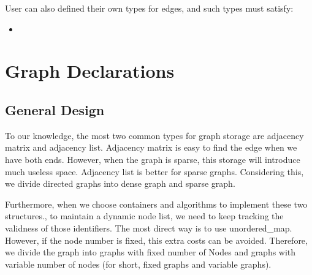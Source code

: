 \documentclass[]{article}
\begin{document}
User can also defined their own types for edges, and such types must satisfy:
\begin{itemize}
	\item 
\end{itemize}

\section{Graph Declarations}
\subsection{General Design}
To our knowledge, the most two common types for graph storage are adjacency matrix and adjacency list. Adjacency matrix is easy to find the edge when we have both ends. However, when the graph is sparse, this storage will introduce much useless space. Adjacency list is better for sparse graphs. Considering this, we divide directed graphs into dense graph and sparse graph.

Furthermore, when we choose containers and algorithms to implement these two structures., to maintain a dynamic node list, we need to keep tracking the validness of those identifiers. The most direct way is to use unordered\_map. However, if the node number is fixed, this extra costs can be avoided. Therefore, we divide the graph into graphs with fixed number of Nodes and graphs with variable number of nodes (for short, fixed graphs and variable graphs).
\end{document}
